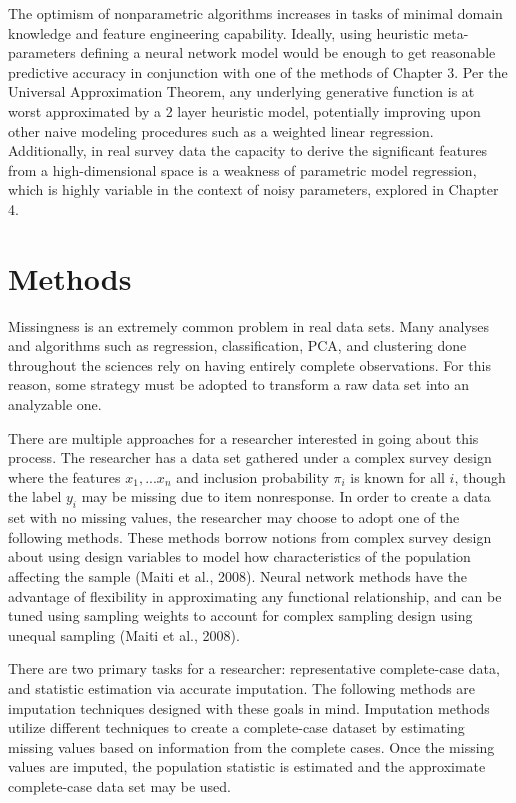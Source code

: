 \documentclass[12pt,twoside]{reedthesis}
\begin{document}
The optimism of nonparametric algorithms increases in tasks of minimal
domain knowledge and feature engineering capability. Ideally, using
heuristic meta-parameters defining a neural network model would be
enough to get reasonable predictive accuracy in conjunction with one of
the methods of Chapter 3. Per the Universal Approximation Theorem, any
underlying generative function is at worst approximated by a 2 layer
heuristic model, potentially improving upon other naive modeling
procedures such as a weighted linear regression. Additionally, in real
survey data the capacity to derive the significant features from a
high-dimensional space is a weakness of parametric model regression,
which is highly variable in the context of noisy parameters, explored in
Chapter 4.

\chapter{Methods}\label{methods}

Missingness is an extremely common problem in real data sets. Many
analyses and algorithms such as regression, classification, PCA, and
clustering done throughout the sciences rely on having entirely complete
observations. For this reason, some strategy must be adopted to
transform a raw data set into an analyzable one.

There are multiple approaches for a researcher interested in going about
this process. The researcher has a data set gathered under a complex
survey design where the features \(x_1,...x_n\) and inclusion
probability \(\pi_i\) is known for all \(i\), though the label \(y_i\)
may be missing due to item nonresponse. In order to create a data set
with no missing values, the researcher may choose to adopt one of the
following methods. These methods borrow notions from complex survey
design about using design variables to model how characteristics of the
population affecting the sample (Maiti et al., 2008). Neural network
methods have the advantage of flexibility in approximating any
functional relationship, and can be tuned using sampling weights to
account for complex sampling design using unequal sampling (Maiti et
al., 2008).

There are two primary tasks for a researcher: representative
complete-case data, and statistic estimation via accurate imputation.
The following methods are imputation techniques designed with these
goals in mind. Imputation methods utilize different techniques to create
a complete-case dataset by estimating missing values based on
information from the complete cases. Once the missing values are
imputed, the population statistic is estimated and the approximate
complete-case data set may be used.
\end{document}

